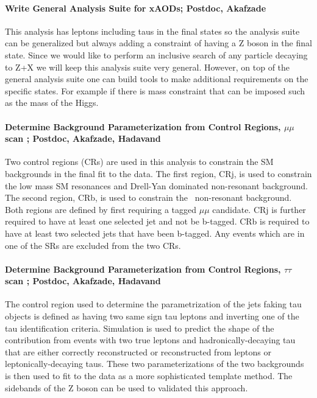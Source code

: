 \paragraph{Write General Analysis Suite for xAODs;  Postdoc, Akafzade} %
This analysis has leptons including taus in the final states so the analysis suite can be generalized but always adding a constraint of having a Z boson in the final state. 
Since we would like to perform an inclusive search of any particle decaying to Z+X we will keep this analysis suite very general. 
However, on top of the general analysis suite one can build tools to make additional requirements on the specific states. For example if there is mass constraint that can be imposed such as the mass of the Higgs.

\paragraph{Determine Background Parameterization from Control Regions, $\mu\mu$ scan ;  Postdoc, Akafzade, Hadavand}
Two control regions (CRs) are used in this analysis to constrain the SM backgrounds in the final fit to the data. The first region, CRj, is used to constrain the 
low mass SM resonances and Drell-Yan dominated non-resonant background. The second region, CRb, is used to constrain the \ttbar\ non-resonant background.
Both regions are defined by first requiring a tagged $\mu\mu$ candidate. CRj is further required to have
at least one selected jet and not be b-tagged. CRb is required to have at least two selected jets that have been b-tagged.
Any events which are in one of the SRs are excluded from the two CRs.

\paragraph{Determine Background Parameterization from Control Regions, $\tau\tau$ scan ;  Postdoc, Akafzade, Hadavand}
The control region used to determine the parametrization of the jets faking tau objects is defined as having two same sign tau leptons and inverting one of the tau identification criteria.
Simulation is used to predict the shape of the contribution from events with two true leptons and hadronically-decaying tau that are either correctly reconstructed or reconstructed
from leptons or leptonically-decaying taus.  These two parameterizations of the two backgrounds is then used to fit to the data as a more sophisticated template method.  The sidebands of the Z boson
can be used to validated this approach.

